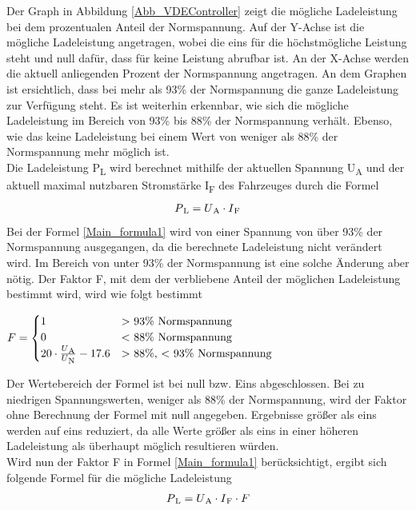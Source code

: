 Der Graph in Abbildung \ref{Abb_VDEController} zeigt die mögliche Ladeleistung bei dem prozentualen Anteil der Normspannung. Auf der Y-Achse ist die mögliche Ladeleistung angetragen, wobei die eins für die höchstmögliche Leistung steht und null dafür, dass für keine Leistung abrufbar ist. An der X-Achse werden die aktuell anliegenden Prozent der Normspannung angetragen. An dem Graphen ist ersichtlich, dass bei mehr als 93\% der Normspannung die ganze Ladeleistung zur Verfügung steht. Es ist weiterhin erkennbar, wie sich die mögliche Ladeleistung im Bereich von 93\% bis 88\% der Normspannung verhält. Ebenso, wie das keine Ladeleistung bei einem Wert von weniger als 88\% der Normspannung mehr möglich ist. \\
Die Ladeleistung P\textsubscript{L} wird berechnet mithilfe der aktuellen Spannung U\textsubscript{A} und der aktuell maximal nutzbaren Stromstärke I\textsubscript{F} des Fahrzeuges durch die Formel
\begin{align}
	P\textsubscript{L} = U\textsubscript{A} \cdot I\textsubscript{F} \label{Main_formula1}
\end{align}
Bei der Formel \ref{Main_formula1} wird von einer Spannung von über 93\% der Normspannung ausgegangen, da die berechnete Ladeleistung nicht verändert wird. Im Bereich von unter 93\% der Normspannung ist eine solche Änderung aber nötig. Der Faktor F, mit dem der verbliebene Anteil der möglichen Ladeleistung bestimmt wird, wird wie folgt bestimmt \\
\begin{center}
	$ F = \begin{cases}
	1 &  \text{$>$ 93\% Normspannung} \\
	0 &  \text{$<$ 88\% Normspannung} \\
	20 \cdot \frac{U\textsubscript{A}}{U\textsubscript{N}} - 17.6 & \text{$>$ 88\%, $<$ 93\% Normspannung}
	\end{cases}
	$
\end{center}
Der Wertebereich der Formel ist bei null bzw. Eins abgeschlossen. Bei zu niedrigen Spannungswerten, weniger als 88\% der Normspannung, wird der Faktor ohne Berechnung der Formel mit null angegeben. Ergebnisse größer als eins werden auf eins reduziert, da alle Werte größer als eins in einer höheren Ladeleistung als überhaupt möglich resultieren würden. \\
Wird nun der Faktor F in Formel \ref{Main_formula1} berücksichtigt, ergibt sich folgende Formel für die mögliche Ladeleistung\\
\begin{align}
	P\textsubscript{L} = U\textsubscript{A} \cdot I\textsubscript{F} \cdot F \label{Main_formula3}
\end{align}
